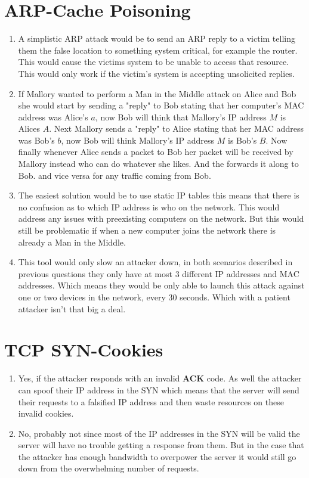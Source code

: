 \documentclass{article}
\begin{document}
\section{ARP-Cache Poisoning}
\begin{enumerate}[A]
	\item A simplistic ARP attack would be to send an ARP reply to a victim
		telling them the false location to something system critical, for
		example the router. This would cause the victims system to be unable to
		access that resource. This would only work if the victim's system is
		accepting unsolicited replies.
	\item If Mallory wanted to perform a Man in the Middle attack on Alice and
		Bob she would start by sending a "reply" to Bob stating that her
		computer's MAC address was Alice's $a$, now Bob will think that
		Mallory's IP address $M$ is Alices $A$. Next Mallory sends a "reply" to
		Alice stating that her MAC address was Bob's $b$, now Bob will think
		Mallory's IP address $M$ is Bob's $B$. Now finally whenever
		Alice sends a packet to Bob her packet will be received by Mallory
		instead who can do whatever she likes. And the forwards it along to Bob.
		and vice versa for any traffic coming from Bob.
	\item The easiest solution would be to use static IP tables this means that
		there is no confusion as to which IP address is who on the network. This
		would address any issues with preexisting computers on the network. But
		this would still be problematic if when a new computer joins the network
		there is already a Man in the Middle.
	\item This tool would only slow an attacker down, in both scenarios
		described in previous questions they only have at most 3 different IP
		addresses and MAC addresses. Which means they would be only able to
		launch this attack against one or two devices in the network, every 30
		seconds. Which with a patient attacker isn't that big a deal.
\end{enumerate}
\section{TCP SYN-Cookies }
\begin{enumerate}[A]
	\item Yes, if the attacker responds with an invalid {\bf ACK} code. As well
		the attacker can spoof their IP address in the SYN which means that the
		server will send their requests to a falsified IP address and then
		waste resources on these invalid cookies.
	\item No, probably not since most of the IP addresses in the SYN will be
		valid the server will have no trouble getting a response from them. But
		in the case that the attacker has enough bandwidth to overpower the
		server it would still go down from the overwhelming number of requests.
\end{enumerate}
\end{document}
